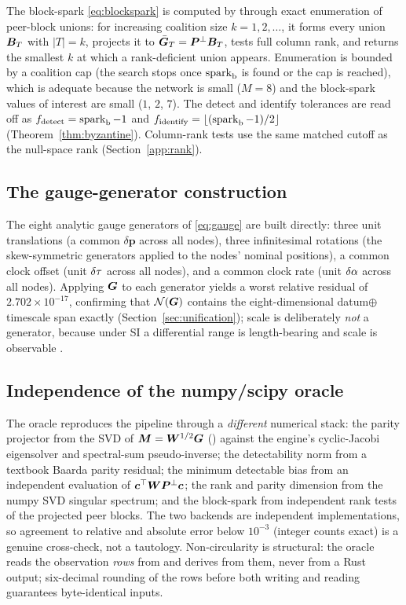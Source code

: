 The block-spark \eqref{eq:blockspark} is computed by  through exact
enumeration of peer-block unions: for increasing coalition size $k=1,2,\dots$, it forms every
union $\bm{B}_T$ with $|T|=k$, projects it to $\bar{\bm{G}}_T=\bm{P}^{\perp}\bm{B}_T$, tests full column rank,
and returns the smallest $k$ at which a rank-deficient union appears. Enumeration is bounded
by a coalition cap  (the search stops once $\operatorname{spark}_{\mathrm b}$ is found
or the cap is reached), which is adequate because the network is small ($M=8$) and the
block-spark values of interest are small ($1$, $2$, $7$). The detect and identify tolerances
are read off as $f_{\mathrm{detect}}=\operatorname{spark}_{\mathrm b}-1$ and $f_{\mathrm{identify}}=
\lfloor(\operatorname{spark}_{\mathrm b}-1)/2\rfloor$ (Theorem~\ref{thm:byzantine}). Column-rank tests use
the same matched cutoff as the null-space rank (Section~\ref{app:rank}).

\subsection{The gauge-generator construction}
\label{app:gauge}

The eight analytic gauge generators of \eqref{eq:gauge} are built directly: three unit
translations (a common $\delta\bm p$ across all nodes), three infinitesimal rotations (the
skew-symmetric generators applied to the nodes' nominal positions), a common clock offset
(unit $\delta\tau$ across all nodes), and a common clock rate (unit $\delta\alpha$ across all nodes).
Applying $\bm{G}$ to each generator yields a worst relative residual of $2.702\times10^{-17}$,
confirming that $\mathcal{N}(\bm{G})$ contains the eight-dimensional datum$\oplus$timescale span
exactly (Section~\ref{sec:unification}); scale is deliberately \emph{not} a generator, because
under SI a differential range is length-bearing and scale is observable
\citep{baweja2026gauge}.

\subsection{Independence of the numpy/scipy oracle}
\label{app:oracle}

The oracle  reproduces the pipeline through a
\emph{different} numerical stack: the parity projector from the SVD of $\bm M=\bm{W}^{1/2}
\bm{G}$ () against the engine's cyclic-Jacobi eigensolver and
spectral-sum pseudo-inverse; the detectability norm from a textbook Baarda parity residual;
the minimum detectable bias from an independent evaluation of $\bm c^\top\bm{W}\bm{P}^{\perp}\bm c$;
the rank and parity dimension from the numpy SVD singular spectrum; and the block-spark from
independent rank tests of the projected peer blocks. The two backends are independent
implementations, so agreement to relative and absolute error below $10^{-3}$ (integer counts
exact) is a genuine cross-check, not a tautology. Non-circularity is structural: the oracle
reads the observation \emph{rows} from  and derives 
from them, never from a Rust output; six-decimal rounding of the rows before both writing and
reading guarantees byte-identical inputs.

